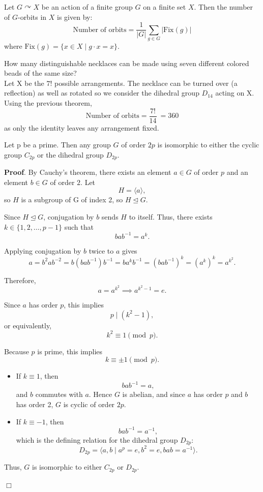 \documentclass[../main.tex]{subfiles}
\begin{document}
\begin{theorem}[]
\label{}
Let \( G \curvearrowright X \) be an action of a finite group \( G \) on a finite set \( X \).  
Then the number of \( G \)-orbits in \( X \) is given by:
\[
\text{Number of orbits} = \frac{1}{|G|} \sum_{g \in G} |\mathrm{Fix}(g)|
\]
where \( \mathrm{Fix}(g) = \{ x \in X \mid g \cdot x = x \} \).
\end{theorem}

\begin{example}\cite{fraleigh}
How many distinguishable necklaces can be made using seven different colored beads of the same size?\\
    Let X be the $7!$ possible arrangements. The necklace can be turned over (a reflection) as well as rotated so we consider the dihedral group $D_{14}$ acting on X. Using the previous theorem, 
\[
\text{Number of orbits} = \frac{7!}{14}\ = 360
\]
as only the identity leaves any arrangement fixed.
\end{example}

\begin{theorem}
Let p be a prime. Then any group $G$ of order $2p$ is isomorphic to either the cyclic group $C_{2p}$ or the dihedral group $D_{2p}$.

\textbf{Proof}.  
By Cauchy's theorem, there exists an element \( a \in G \) of order $p$ and an element \( b \in G \) of order $2$. Let
\[
H = \langle a \rangle,
\]
so \( H \) is a subgroup of G of index 2, so \( H \trianglelefteq G \).

Since \( H \trianglelefteq G \), conjugation by \( b \) sends \( H \) to itself. Thus, there exists \( k \in \{1, 2, \ldots, p-1\} \) such that
\[
b a b^{-1} = a^k.
\]

Applying conjugation by \( b \) twice to \( a \) gives
\[
a = b^2 a b^{-2} = b (b a b^{-1}) b^{-1} = b a^k b^{-1} = (b a b^{-1})^k = (a^k)^k = a^{k^2}.
\]

Therefore,
\[
a = a^{k^2} \implies a^{k^2 - 1} = e.
\]

Since \( a \) has order \( p \), this implies
\[
p \mid (k^2 - 1),
\]
or equivalently,
\[
k^2 \equiv 1 \pmod p.
\]

Because \( p \) is prime, this implies
\[
k \equiv \pm 1 \pmod p.
\]

\begin{itemize}
\item If \( k \equiv 1 \), then
\[
b a b^{-1} = a,
\]
and \( b \) commutes with \( a \). Hence \( G \) is abelian, and since \( a \) has order \( p \) and \( b \) has order 2, \( G \) is cyclic of order \( 2p \).

\item If \( k \equiv -1 \), then
\[
b a b^{-1} = a^{-1},
\]
which is the defining relation for the dihedral group \( D_{2p} \):
\[
D_{2p} = \langle a, b \mid a^p = e, b^2 = e, b a b = a^{-1} \rangle.
\]
\end{itemize}

Thus, \( G \) is isomorphic to either \( C_{2p} \) or \( D_{2p} \).

\hfill\(\Box\)
\end{theorem}
\end{document}
